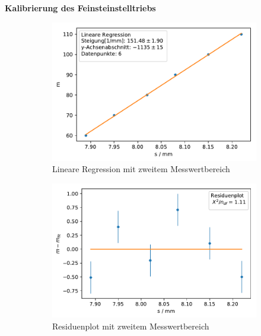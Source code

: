 \documentclass[12pt,a4paper]{article}
\begin{document}
\textbf{Kalibrierung des Feinsteinstelltriebs}
\begin{figure}[H]
	\centering
	\begin{subfigure}{0.49\textwidth}
		\centering
		\includegraphics[width=\textwidth]{Python/Uebersetzungsfaktor2_LinReg.pdf}
		\caption{Lineare Regression mit zweitem Messwertbereich}
		\label{k2LinReg}
	\end{subfigure}
	\begin{subfigure}{0.49\textwidth}
		\centering
		\includegraphics[width=\textwidth]{Python/Uebersetzungsfaktor2_Residuen.pdf}
		\caption{Residuenplot mit zweitem Messwertbereich}
		\label{k2ResPlot}
	\end{subfigure}
	\begin{subfigure}{0.49\textwidth}
		\centering

\end{subfigure}
\end{figure}
\end{document}
